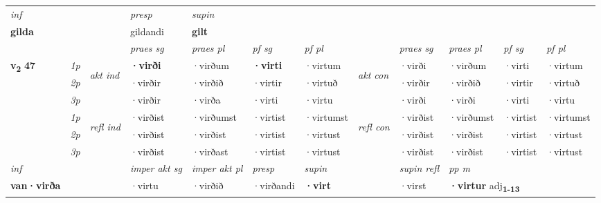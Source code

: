 \begin{longtable}[l]{X>{\footnotesize\itshape}llXXXXlXXXX}
\cmidrule{4-7}
   {\textit{inf}} & &     & \textit{presp} & \textit{supin}   \\*
  {\textbf{gilda}} & &     & gildandi &  \textbf{gilt}   \\*

\midrule

 & &   & \textit{praes sg}  & \textit{praes pl}    & \textit{ pf sg} & \textit{pf pl} & & \textit{praes sg}  & \textit{praes pl}    & \textit{pf sg} & \textit{pf pl }  \\ \cmidrule{4-7} \cmidrule{9-12}
 \multirow{2}{*}{{{\textbf{v{\textsubscript{2}}} \Large{\textbf{47}}}}}  & 1p & \multirow{3}{*}{\begin{turn}{90}\textit{akt ind}\end{turn}} & \textbf{·virði} & ·virðum & \textbf{·virti} & ·virtum & \multirow{3}{*}{\begin{turn}{90}\textit{akt con}\end{turn}} &·virði & ·virðum & ·virti & ·virtum\\*
 & 2p &  &  ·virðir  & ·virðið & ·virtir & ·virtuð & & ·virðir & ·virðið & ·virtir & ·virtuð \\*
 & 3p &  & ·virðir & ·virða & ·virti & ·virtu & & ·virði & ·virði& ·virti & ·virtu \\*
\cmidrule{4-7} \cmidrule{9-12}
 & 1p & \multirow{3}{*}{\begin{turn}{90}\textit{refl ind}\end{turn}}  & ·virðist & ·virðumst & ·virtist & ·virtumst & \multirow{3}{*}{\begin{turn}{90}\textit{refl con}\end{turn}}  &·virðist & ·virðumst & ·virtist & ·virtumst \\*
 & 2p &  & ·virðist & ·virðist & ·virtist & ·virtust & &·virðist & ·virðist & ·virtist & ·virtust \\*
 & 3p  & & ·virðist & ·virðast & ·virtist & ·virtust & & ·virðist & ·virðist& ·virtist & ·virtust \\*
\cmidrule{4-7} \cmidrule{9-12}

   {\textit{inf}} & &  & \textit{imper akt sg} & \textit{imper akt pl}   & \textit{presp} & \textit{supin} && \textit{supin refl} & \textit{pp m} \\*
  {\textbf{van\allowbreak ·virða}} & && ·virtu  & ·virðið   & ·virðandi &  \textbf{·virt} && ·virst & \multicolumn{2}{l}{\textbf{·virtur} adj\textbf{\textsubscript{1-13}}} \\*

\midrule


\end{longtable}
